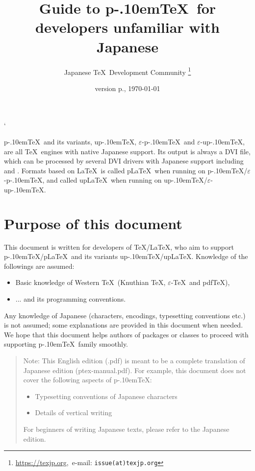 \documentclass[a4paper,11pt]{article}
\let\emph=\origemph
\def\epTeX{$\varepsilon$-\pTeX}\def\eTeX{$\varepsilon$-\TeX}
\def\eupTeX{$\varepsilon$-\upTeX}\def\upTeX{u\pTeX}
\def\pTeX{p\kern-.10em\TeX}
\def\pLaTeX{p\LaTeX}\def\upLaTeX{u\pLaTeX}
\def\pdfTeX{pdf\TeX}
\begin{document}
\catcode`
\title{\textsf{\textbf{Guide to \pTeX\ for developers unfamiliar with Japanese}}}
\author{Japanese \TeX\ Development Community\null
\thanks{\url{https://texjp.org},\ e-mail: \texttt{issue(at)texjp.org}}}
\date{version p\the\ptexversion.\the\ptexminorversion\ptexrevision, \today}
\maketitle

\pTeX\ and its variants, \upTeX, \epTeX\ and \eupTeX, are all \TeX\ engines
with native Japanese support.
Its output is always a DVI file, which can be processed by several
DVI drivers with Japanese support including \emph{dvips} and \emph{dvipdfmx}.
Formats based on \LaTeX\ is called \pLaTeX\ when running on \pTeX/\epTeX,
and called \upLaTeX\ when running on \upTeX/\eupTeX.

\section*{Purpose of this document}

This document is written for developers of \TeX/\LaTeX, who aim to
support \pTeX/\pLaTeX\ and its variants \upTeX/\upLaTeX.
Knowledge of the followings are assumed:
\begin{itemize}
  \item Basic knowledge of Western \TeX\ (Knuthian \TeX, \eTeX\ and \pdfTeX),
  \item ... and its programming conventions.
\end{itemize}

Any knowledge of Japanese (characters, encodings, typesetting conventions etc.)
is not assumed; some explanations are provided in this document when needed.
We hope that this document helps authors of packages or classes
to proceed with supporting \pTeX\ family smoothly.

\begin{quotation}
Note: This English edition (\jobname.pdf) is \emph{not} meant
to be a complete translation of Japanese edition (ptex-manual.pdf).
For example, this document does not cover the following aspects of \pTeX:
\begin{itemize}
  \item Typesetting conventions of Japanese characters
  \item Details of vertical writing
\end{itemize}
For beginners of writing Japanese texts,
please refer to the Japanese edition.
\end{quotation}
\end{document}
